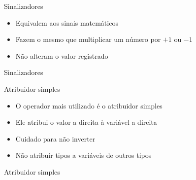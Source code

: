 \documentclass[11pt]{beamer}
\begin{document}
	\begin{frame}{Sinalizadores}
		\begin{itemize}
			\presentationPause\item Equivalem aos sinais matemáticos
			\presentationPause\item Fazem o mesmo que multiplicar um número por $+1$ ou $-1$
			\presentationPause\item Não alteram o valor registrado
		\end{itemize}
		\presentationPause
	\end{frame}\begin{frame}{Sinalizadores}
		
	\end{frame}

	\begin{frame}{Atribuidor simples}
		\begin{itemize}
			\presentationPause\item O operador mais utilizado é o atribuidor simples
			\presentationPause\item Ele atribui o valor a direita à variável a direita
			\presentationPause\item Cuidado para não inverter
			\presentationPause\item Não atribuir tipos a variáveis de outros tipos
		\end{itemize}
		\presentationPause
	\end{frame}\begin{frame}{Atribuidor simples}
		
	\end{frame}
\end{document}
